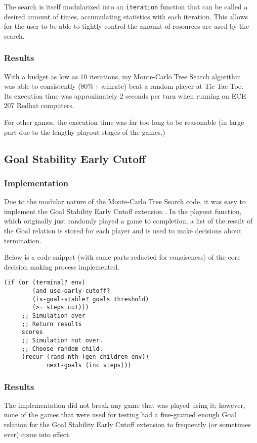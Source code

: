 \documentclass[letterpaper]{article}
\begin{document}
The search is itself modularized into an \texttt{iteration} function that can be called a desired amount of times, accumulating statistics with each iteration. This allows for the user to be able to tightly control the amount of resources are used by the search.

\subsubsection{Results}
With a budget as low as 10 iterations, my Monte-Carlo Tree Search algorithm was able to consistently (80\%+ winrate) beat a random player at Tic-Tac-Toe. Its execution time was approximately 2 seconds per turn when running on ECE 207 Redhat computers.

For other games, the execution time was far too long to be reasonable (in large part due to the lengthy playout stages of the games.)

\subsection{Goal Stability Early Cutoff}
\subsubsection{Implementation}
Due to the modular nature of the Monte-Carlo Tree Search code, it was easy to implement the Goal Stability Early Cutoff extension \cite{finnsson2012generalized}. In the playout function, which originally just randomly played a game to completion, a list of the result of the Goal relation is stored for each player and is used to make decisions about termination.

Below is a code snippet (with some parts redacted for conciseness) of the core decision making process implemented.
\begin{lstlisting}[frame=single,caption=Clojure implementation of Goal Stability Early Cutoff]
(if (or (terminal? env)
        (and use-early-cutoff?
        (is-goal-stable? goals threshold)
        (>= steps cut)))
     ;; Simulation over
     ;; Return results
     scores
     ;; Simulation not over.
     ;; Choose random child.
     (recur (rand-nth (gen-children env)) 
            next-goals (inc steps)))
\end{lstlisting}

\subsubsection{Results}
The implementation did not break any game that was played using it; however, none of the games that were used for testing had a fine-grained enough Goal relation for the Goal Stability Early Cutoff extension to frequently (or sometimes ever) come into effect.
\end{document}
